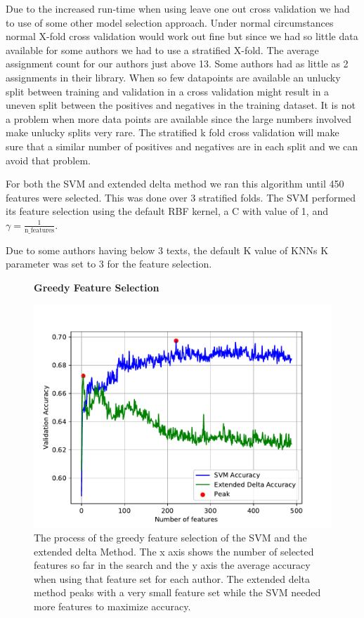 Due to the increased run-time when using leave one out cross validation we
had to use of some other model selection approach. Under normal circumstances
normal X-fold cross validation would work out fine but since we had so little
data available for some authors we had to use a stratified X-fold. The average
assignment count for our authors just above 13. Some authors had as little as 2
assignments in their library. When so few datapoints are available an unlucky
split between training and validation in a cross validation might result in a
uneven split between the positives and negatives in the training dataset. It
is not a problem when more data points are available since the large numbers
involved make unlucky splits very rare. The stratified k fold cross validation
will make sure that a similar number of positives and negatives are in each
split and we can avoid that problem.

For both the \gls{SVM} and extended delta method we ran this algorithm until 450
features were selected. This was done over 3 stratified folds. The \gls{SVM}
performed its feature selection using the default RBF kernel, a C with value of
1, and $\gamma = \frac{1}{\text{n\_features}}$.

Due to some authors having below 3 texts,
the default K value of \glspl{KNN} K parameter was set to 3 for the feature
selection.

\begin{figure}
    \centering
    \textbf{Greedy Feature Selection}\par\medskip
    \includegraphics[scale=0.6]{./pictures/experiments/feature_selection}
    \caption{The process of the greedy feature selection of the SVM and the
        extended delta Method. The x axis shows the number of selected features
        so far in the search and the y axis the average accuracy when using that
        feature set for each author. The extended delta method peaks with a very
        small feature set while the \gls{SVM} needed more features to maximize
        accuracy.
    }
    \label{fig:fs_results}
\end{figure}

